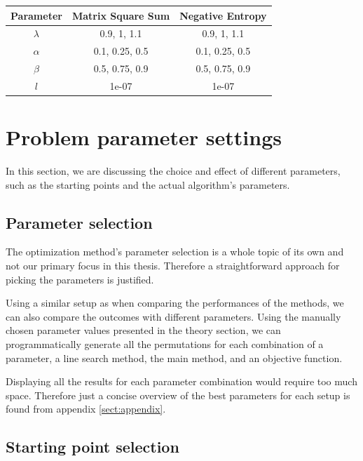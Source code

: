 \documentclass[english, 12pt, a4paper, sci, utf8, a-1b, online, table]{aaltothesis}
\begin{document}
\begin{table}[H]
\label{tab:params_ArmijoSearch}
\centering
{}
\begin{tabular}{|c|c|c|}
\hline
\rowcolor{gray!25}
Parameter & Matrix Square Sum & Negative Entropy \\
\hline
$\lambda$ & 0.9, 1, 1.1 & 0.9, 1, 1.1 \\
$\alpha$ & 0.1, 0.25, 0.5 & 0.1, 0.25, 0.5 \\
$\beta$ & 0.5, 0.75, 0.9 & 0.5, 0.75, 0.9 \\
$l$ & 1e-07 & 1e-07 \\
\hline
\end{tabular}
\end{table}


\section{Problem parameter settings}
\label{sect:problem_parameter_settings}


In this section, we are discussing the choice and effect of different parameters, such as the starting points and the actual algorithm's parameters.


\subsection{Parameter selection}
\label{sect:parameter_selection}


The optimization method's parameter selection is a whole topic of its own and not our primary focus in this thesis. Therefore a straightforward approach for picking the parameters is justified.

Using a similar setup as when comparing the performances of the methods, we can also compare the outcomes with different parameters. Using the manually chosen parameter values presented in the theory section, we can programmatically generate all the permutations for each combination of a parameter, a line search method, the main method, and an objective function.

Displaying all the results for each parameter combination would require too much space. Therefore just a concise overview of the best parameters for each setup is found from appendix \ref{sect:appendix}.


\subsection{Starting point selection}
\label{sect:starting_point_selection}
\end{document}

